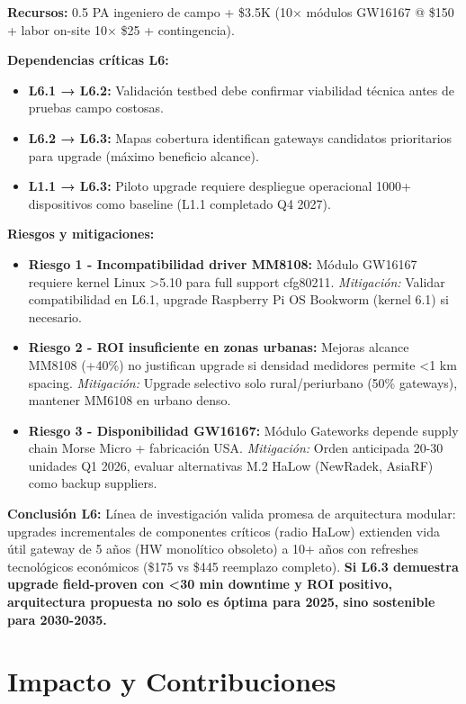 \textbf{Recursos:} 0.5 PA ingeniero de campo + \$3.5K (10$\times$ módulos GW16167 @ \$150 + labor on-site 10$\times$ \$25 + contingencia).

\textbf{Dependencias críticas L6:}
\begin{itemize}
    \item \textbf{L6.1 → L6.2:} Validación testbed debe confirmar viabilidad técnica antes de pruebas campo costosas.
    \item \textbf{L6.2 → L6.3:} Mapas cobertura identifican gateways candidatos prioritarios para upgrade (máximo beneficio alcance).
    \item \textbf{L1.1 → L6.3:} Piloto upgrade requiere despliegue operacional 1000+ dispositivos como baseline (L1.1 completado Q4 2027).
\end{itemize}

\textbf{Riesgos y mitigaciones:}
\begin{itemize}
    \item \textbf{Riesgo 1 - Incompatibilidad driver MM8108:} Módulo GW16167 requiere kernel Linux >5.10 para full support cfg80211. \textit{Mitigación:} Validar compatibilidad en L6.1, upgrade Raspberry Pi OS Bookworm (kernel 6.1) si necesario.
    \item \textbf{Riesgo 2 - ROI insuficiente en zonas urbanas:} Mejoras alcance MM8108 (+40\%) no justifican upgrade si densidad medidores permite <1 km spacing. \textit{Mitigación:} Upgrade selectivo solo rural/periurbano (50\% gateways), mantener MM6108 en urbano denso.
    \item \textbf{Riesgo 3 - Disponibilidad GW16167:} Módulo Gateworks depende supply chain Morse Micro + fabricación USA. \textit{Mitigación:} Orden anticipada 20-30 unidades Q1 2026, evaluar alternativas M.2 HaLow (NewRadek, AsiaRF) como backup suppliers.
\end{itemize}

\textbf{Conclusión L6:} Línea de investigación valida promesa de arquitectura modular: upgrades incrementales de componentes críticos (radio HaLow) extienden vida útil gateway de 5 años (HW monolítico obsoleto) a 10+ años con refreshes tecnológicos económicos (\$175 vs \$445 reemplazo completo). \textbf{Si L6.3 demuestra upgrade field-proven con <30 min downtime y ROI positivo, arquitectura propuesta no solo es óptima para 2025, sino sostenible para 2030-2035.}

\section{Impacto y Contribuciones}

